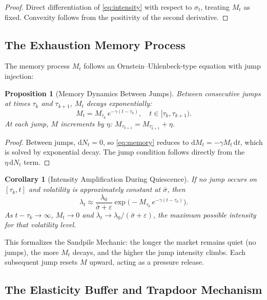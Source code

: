 \documentclass[11pt,a4paper]{article}
\newtheorem{proposition}[theorem]{Proposition}
\newtheorem{corollary}[theorem]{Corollary}
\newcommand{\diff}{\mathrm{d}}
\newcommand{\dt}{\diff t}
\begin{document}
\begin{proof}
Direct differentiation of \eqref{eq:intensity} with respect to $\sigma_t$,
treating $M_t$ as fixed. Convexity follows from the positivity of the second
derivative.
\end{proof}

\subsection{The Exhaustion Memory Process}
\label{sec:memory}

The memory process $M_t$ follows an Ornstein--Uhlenbeck-type equation with
jump injection:

\begin{proposition}[Memory Dynamics Between Jumps]
\label{prop:memory_between}
Between consecutive jumps at times $\tau_k$ and $\tau_{k+1}$, $M_t$ decays
exponentially:
\[
  M_t = M_{\tau_k}\, e^{-\gamma(t - \tau_k)}, \quad t \in [\tau_k, \tau_{k+1}).
\]
At each jump, $M$ increments by $\eta$:
$M_{\tau_{k+1}} = M_{\tau_{k+1}^-} + \eta$.
\end{proposition}

\begin{proof}
Between jumps, $\diff N_t = 0$, so \eqref{eq:memory} reduces to
$\diff M_t = -\gamma M_t \,\dt$, which is solved by exponential decay.
The jump condition follows directly from the $\eta\,\diff N_t$ term.
\end{proof}

\begin{corollary}[Intensity Amplification During Quiescence]
\label{cor:quiescence}
If no jump occurs on $[\tau_k, t]$ and volatility is approximately constant
at $\bar{\sigma}$, then
\[
  \lambda_t \approx \frac{\lambda_0}{\bar{\sigma} + \varepsilon}
  \exp\!\bigl(-M_{\tau_k}\, e^{-\gamma(t-\tau_k)}\bigr).
\]
As $t - \tau_k \to \infty$, $M_t \to 0$ and
$\lambda_t \to \lambda_0 / (\bar{\sigma} + \varepsilon)$, the maximum
possible intensity for that volatility level.
\end{corollary}

This formalizes the Sandpile Mechanic: the longer the market remains
quiet (no jumps), the more $M_t$ decays, and the higher the jump intensity
climbs. Each subsequent jump resets $M$ upward, acting as a pressure release.

\subsection{The Elasticity Buffer and Trapdoor Mechanism}
\label{sec:buffer}
\end{document}
